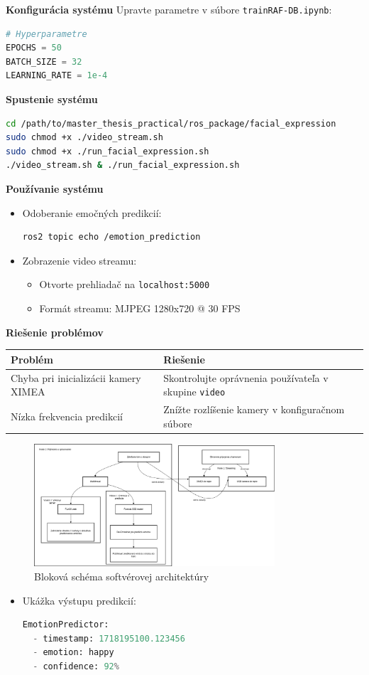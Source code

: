\textbf{Konfigurácia systému}  
Upravte parametre v súbore \texttt{trainRAF-DB.ipynb}:
\begin{lstlisting}[language=Python]
# Hyperparametre
EPOCHS = 50
BATCH_SIZE = 32
LEARNING_RATE = 1e-4
\end{lstlisting}

\textbf{Spustenie systému}  
\begin{lstlisting}[language=bash]
cd /path/to/master_thesis_practical/ros_package/facial_expression
sudo chmod +x ./video_stream.sh
sudo chmod +x ./run_facial_expression.sh
./video_stream.sh & ./run_facial_expression.sh
\end{lstlisting}

\textbf{Používanie systému}  
\begin{itemize}
\item Odoberanie emočných predikcií:
\begin{lstlisting}[language=bash]
ros2 topic echo /emotion_prediction
\end{lstlisting}

\item Zobrazenie video streamu:
\begin{itemize}
\item Otvorte prehliadač na \texttt{localhost:5000}
\item Formát streamu: MJPEG 1280x720 @ 30 FPS
\end{itemize}
\end{itemize}

\textbf{Riešenie problémov}  

\begin{tabular}{|p{6cm}|p{9cm}|}
\hline
Problém & Riešenie \\
\hline
Chyba pri inicializácii kamery XIMEA & Skontrolujte oprávnenia používateľa v skupine \texttt{video} \\
Nízka frekvencia predikcií & Znížte rozlíšenie kamery v konfiguračnom súbore \\
\hline
\end{tabular}

\begin{figure}[!htpb]
\centering
\includegraphics[width=0.8\textwidth]{img/ros2_nodes.png}
\caption{Bloková schéma softvérovej architektúry}
\label{fig:ros2_nodes}
\end{figure}

\begin{itemize}
\item Ukážka výstupu predikcií:
\begin{lstlisting}[language=Python]
EmotionPredictor:
  - timestamp: 1718195100.123456
  - emotion: happy
  - confidence: 92%
\end{lstlisting}
\end{itemize}

